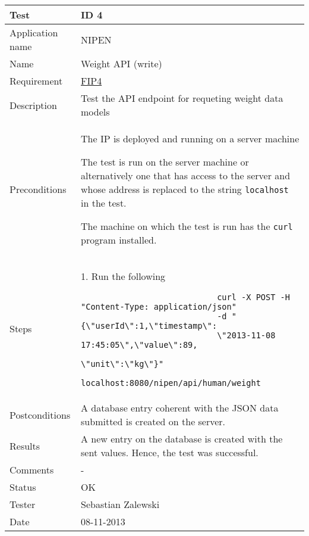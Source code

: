 \begin{table}
\begin{center}
\begin{tabular}{ | l | p{10cm} | }
	\hline
	\textbf{Test}	&	\textbf{ID 4} \\
	\hline\noalign{\smallskip}\noalign{\smallskip}\hline
	Application name	& NIPEN \\
	Name				& Weight API (write) \\
	Requirement			& \hyperref[table:reqip]{FIP4} \\
	Description			& Test the API endpoint for requeting weight data models \\
	Preconditions		&	\par The IP is deployed and running on a server machine
							\par The test is run on the server machine or alternatively
							one that has access to the server and whose address is replaced to the
							string \verb|localhost| in the test.
							\par The machine on which the test is run has the \verb|curl| program installed. \\
	Steps 				&	1. Run the following \begin{verbatim}
							curl -X POST -H "Content-Type: application/json" 
							-d "{\"userId\":1,\"timestamp\":
							\"2013-11-08 17:45:05\",\"value\":89,
							\"unit\":\"kg\"}" 
							localhost:8080/nipen/api/human/weight
							\end{verbatim} \\
	Postconditions		& A database entry coherent with the JSON data submitted is created on the server. \\
	Results				& A new entry on the database is created with the sent values.
						  Hence, the test was successful. \\
	Comments			& - \\
	Status				& OK \\
	Tester				& Sebastian Zalewski \\
	Date				& 08-11-2013 \\
	\hline
\end{tabular}
\end{center}
\end{table}

